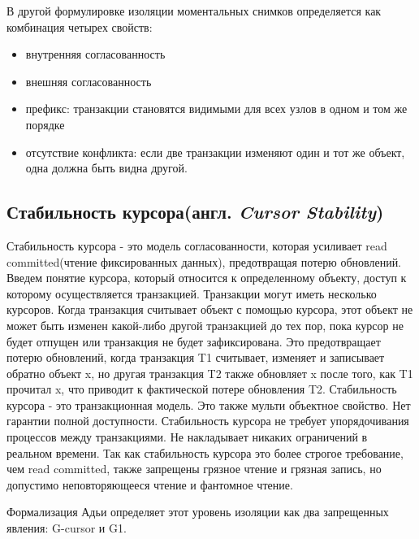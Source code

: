 \documentclass[12pt,  openany]{book}
\begin{document}
В другой формулировке изоляции моментальных снимков определяется как комбинация четырех свойств:
\begin{itemize}
\item внутренняя согласованность
\item внешняя согласованность
\item префикс: транзакции становятся видимыми для всех узлов в одном и том же порядке
\item отсутствие конфликта: если две транзакции изменяют один и тот же объект, одна должна быть видна другой.
\end{itemize}

\subsection{Стабильность курсора(англ.  \textit{Cursor Stability})}
Стабильность курсора - это модель согласованности, которая усиливает read committed(чтение фиксированных данных), предотвращая потерю обновлений.
Введем понятие курсора, который относится к определенному объекту, доступ к которому осуществляется транзакцией. Транзакции могут иметь несколько курсоров. Когда транзакция считывает объект с помощью курсора, этот объект не может быть изменен какой-либо другой транзакцией до тех пор, пока курсор не будет отпущен или транзакция не будет зафиксирована.
Это предотвращает потерю обновлений, когда транзакция T1 считывает, изменяет и записывает обратно объект x, но другая транзакция T2 также обновляет x после того, как T1 прочитал x, что приводит к фактической потере обновления T2.
Стабильность курсора - это транзакционная модель. Это также мульти объектное свойство.
Нет гарантии полной доступности.
Стабильность курсора не требует упорядочивания процессов между транзакциями.
Не накладывает никаких ограничений в реальном времени.
Так как стабильность курсора это более строгое требование, чем read committed, также запрещены грязное чтение и грязная запись, но допустимо неповторяющееся чтение и фантомное чтение.

Формализация Адьи определяет этот уровень изоляции как два запрещенных явления: G-cursor и G1.
\end{document}
